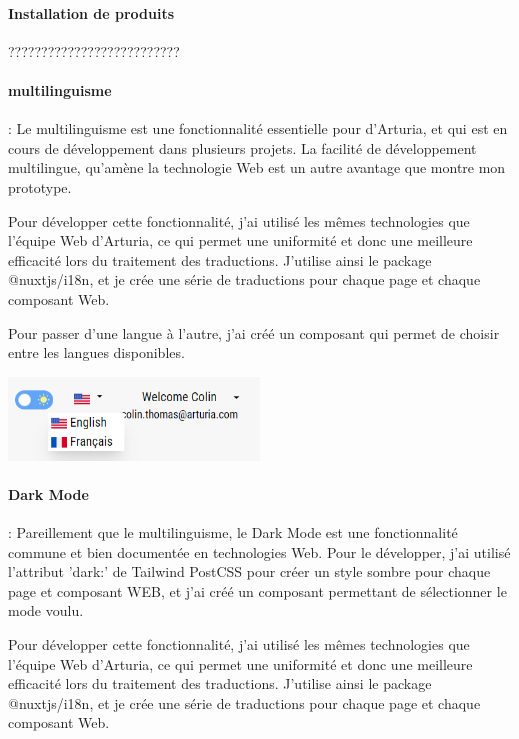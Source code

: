 \documentclass[francais]{rapportPFE}  %
\begin{document}
\paragraph{Installation de produits} ??????????????????????????
\paragraph{multilinguisme}: Le multilinguisme est une fonctionnalité essentielle pour d'Arturia, et qui est en cours de développement dans plusieurs projets. La facilité de développement multilingue, qu'amène la technologie Web est un autre avantage que montre mon prototype.

Pour développer cette fonctionnalité, j'ai utilisé les mêmes technologies que l'équipe Web d'Arturia, ce qui permet une uniformité et donc une meilleure efficacité lors du traitement des traductions. J'utilise ainsi le package @nuxtjs/i18n, et je crée une série de traductions pour chaque page et chaque composant Web.

Pour passer d'une langue à l'autre, j'ai créé un composant qui permet de choisir entre les langues disponibles.

\begin{center}
	\centering
	\includegraphics[width=0.5\textwidth]{graphics/languages.png}
	\begin{tiny}
	\end{tiny}
	\label{fig}
\end{center}

\paragraph{Dark Mode}: Pareillement que le multilinguisme, le Dark Mode est une fonctionnalité commune et bien documentée en technologies Web. Pour le développer, j'ai utilisé l'attribut 'dark:' de Tailwind PostCSS pour créer un style sombre pour chaque page et composant WEB, et j'ai créé un composant permettant de sélectionner le mode voulu.

Pour développer cette fonctionnalité, j'ai utilisé les mêmes technologies que l'équipe Web d'Arturia, ce qui permet une uniformité et donc une meilleure efficacité lors du traitement des traductions. J'utilise ainsi le package @nuxtjs/i18n, et je crée une série de traductions pour chaque page et chaque composant Web.
\end{document}
